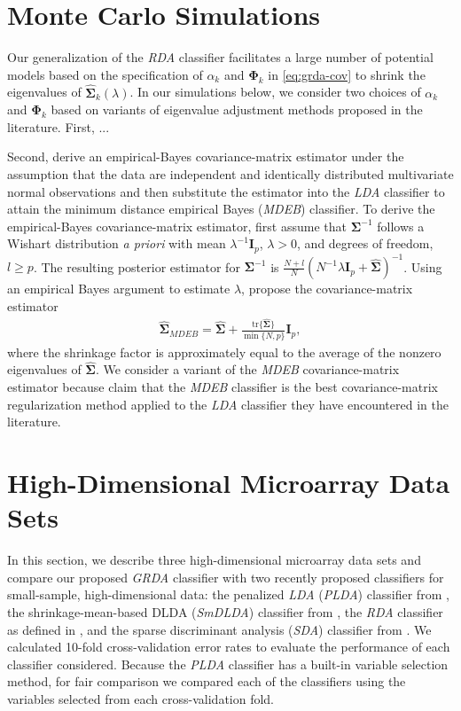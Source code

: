 \documentclass[11pt]{article}
\newcommand{\tr}{\text{tr}}
\begin{document}
\section{Monte Carlo Simulations}

Our generalization of the \emph{RDA} classifier facilitates a large number of potential models based on the specification of $\alpha_k$ and $\bm \Phi_k$ in \eqref{eq:grda-cov} to shrink the eigenvalues of $\widehat{\bm \Sigma}_k(\lambda)$. In our simulations below, we consider two choices of $\alpha_k$ and $\bm \Phi_k$ based on variants of eigenvalue adjustment methods proposed in the literature. First, ... 

Second, \cite{Srivastava:2007ww} derive an empirical-Bayes covariance-matrix estimator under the assumption that the data are independent and identically distributed multivariate normal observations and then substitute the estimator into the \emph{LDA} classifier to attain the minimum distance empirical Bayes (\emph{MDEB}) classifier. To derive the empirical-Bayes covariance-matrix estimator, \cite{Srivastava:2007ww} first assume that $\bm \Sigma^{-1}$ follows a Wishart distribution \emph{a priori} with mean $\lambda^{-1} \bm I_p$, $\lambda > 0$, and degrees of freedom, $l \ge p$. The resulting posterior estimator for $\bm \Sigma^{-1}$ is $\frac{N + l}{N}(N^{-1}\lambda \bm I_p + \widehat{\bm \Sigma})^{-1}$. Using an empirical Bayes argument to estimate $\lambda$, \cite{Srivastava:2007ww} propose the covariance-matrix estimator
\begin{align*}
	\widehat{\bm \Sigma}_{MDEB} = \widehat{\bm \Sigma} + \frac{\tr \{\widehat{\bm \Sigma}\}}{\min\{N, p\}} \bm I_p,
\end{align*}
where the shrinkage factor is approximately equal to the average of the nonzero eigenvalues of $\widehat{\bm \Sigma}$. We consider a variant of the \emph{MDEB} covariance-matrix estimator because \cite{Srivastava:2007ww} claim that the \emph{MDEB} classifier is the best covariance-matrix regularization method applied to the \emph{LDA} classifier they have encountered in the literature.

\section{High-Dimensional Microarray Data Sets}

In this section, we describe three high-dimensional microarray data sets and compare our proposed \emph{GRDA} classifier with two recently proposed classifiers for small-sample, high-dimensional data: the penalized \emph{LDA} (\emph{PLDA}) classifier from \cite{Witten:2011kc}, the shrinkage-mean-based DLDA (\emph{SmDLDA}) classifier from \cite{Tong:2012hw}, the \emph{RDA} classifier as defined in \cite{Hastie:2008dt}, and the sparse discriminant analysis (\emph{SDA}) classifier from \cite{Clemmensen:2011kr}. We calculated 10-fold cross-validation error rates \citep{Hastie:2008dt} to evaluate the performance of each classifier considered. Because the \emph{PLDA} classifier has a built-in variable selection method, for fair comparison we compared each of the classifiers using the variables selected from each cross-validation fold.
\end{document}

